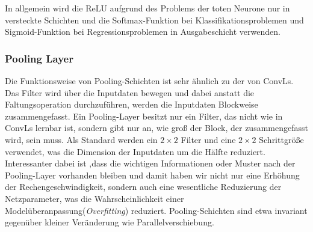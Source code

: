 \documentclass[12pt,a4paper]{scrartcl}
\numberwithin{equation}{section}
\begin{document}
In allgemein wird die ReLU aufgrund des Problems der toten Neurone nur in versteckte Schichten und die Softmax-Funktion bei Klassifikationsproblemen und Sigmoid-Funktion bei Regressionsproblemen in Ausgabeschicht verwenden.

\subsubsection{Pooling Layer}\label{Pooling Layer}
Die Funktionsweise von Pooling-Schichten ist sehr ähnlich zu der von \acsp{ConvL}. Das Filter wird über die Inputdaten bewegen und dabei anstatt die Faltungsoperation durchzuführen, werden die Inputdaten Blockweise zusammengefasst. Ein Pooling-Layer besitzt nur ein Filter, das nicht wie in \acsp{ConvL} lernbar ist, sondern gibt nur an, wie groß der Block, der zusammengefasst wird, sein muss.
Als Standard werden ein $ 2 \times 2 $ Filter und eine $ 2 \times 2 $ Schrittgröße verwendet, was die Dimension der Inputdaten um die Hälfte reduziert. Interessanter dabei ist ,dass die wichtigen Informationen oder Muster nach der Pooling-Layer vorhanden bleiben und damit haben wir nicht nur eine Erhöhung der Rechengeschwindigkeit, sondern auch eine wesentliche Reduzierung der Netzparameter, was die Wahrscheinlichkeit einer Modelüberanpassung(\textit{Overfitting}) reduziert. Pooling-Schichten sind etwa invariant gegenüber kleiner Veränderung wie Parallelverschiebung\cite{4}.
\end{document}
